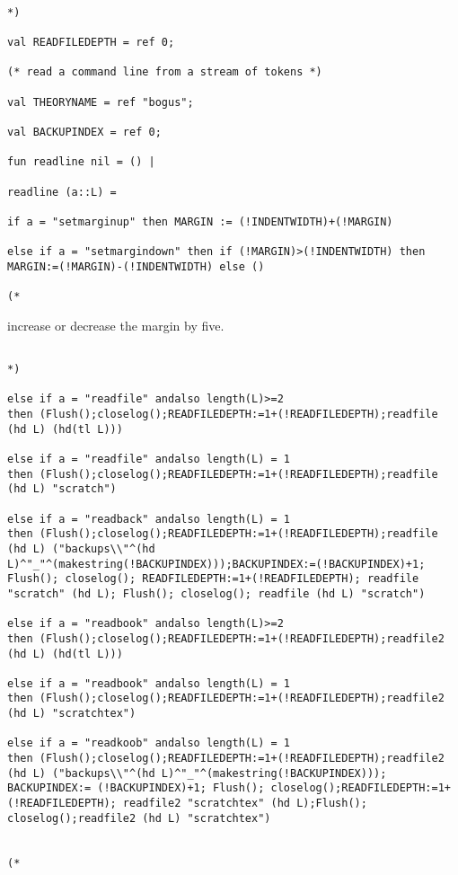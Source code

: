 \documentclass{article}
\begin{document}
\begin{verbatim}

*)

val READFILEDEPTH = ref 0;

(* read a command line from a stream of tokens *)

val THEORYNAME = ref "bogus";

val BACKUPINDEX = ref 0;

fun readline nil = () |

readline (a::L) =

if a = "setmarginup" then MARGIN := (!INDENTWIDTH)+(!MARGIN) 

else if a = "setmargindown" then if (!MARGIN)>(!INDENTWIDTH) then MARGIN:=(!MARGIN)-(!INDENTWIDTH) else ()

(*

\end{verbatim}

increase or decrease the margin by five.

\begin{verbatim}

*)

else if a = "readfile" andalso length(L)>=2 
then (Flush();closelog();READFILEDEPTH:=1+(!READFILEDEPTH);readfile (hd L) (hd(tl L)))

else if a = "readfile" andalso length(L) = 1
then (Flush();closelog();READFILEDEPTH:=1+(!READFILEDEPTH);readfile (hd L) "scratch")

else if a = "readback" andalso length(L) = 1
then (Flush();closelog();READFILEDEPTH:=1+(!READFILEDEPTH);readfile (hd L) ("backups\\"^(hd L)^"_"^(makestring(!BACKUPINDEX)));BACKUPINDEX:=(!BACKUPINDEX)+1; Flush(); closelog(); READFILEDEPTH:=1+(!READFILEDEPTH); readfile "scratch" (hd L); Flush(); closelog(); readfile (hd L) "scratch")

else if a = "readbook" andalso length(L)>=2 
then (Flush();closelog();READFILEDEPTH:=1+(!READFILEDEPTH);readfile2 (hd L) (hd(tl L)))

else if a = "readbook" andalso length(L) = 1
then (Flush();closelog();READFILEDEPTH:=1+(!READFILEDEPTH);readfile2 (hd L) "scratchtex")

else if a = "readkoob" andalso length(L) = 1
then (Flush();closelog();READFILEDEPTH:=1+(!READFILEDEPTH);readfile2 (hd L) ("backups\\"^(hd L)^"_"^(makestring(!BACKUPINDEX))); BACKUPINDEX:= (!BACKUPINDEX)+1; Flush(); closelog();READFILEDEPTH:=1+(!READFILEDEPTH); readfile2 "scratchtex" (hd L);Flush();  closelog();readfile2 (hd L) "scratchtex")


(*

\end{verbatim}
\end{document}
